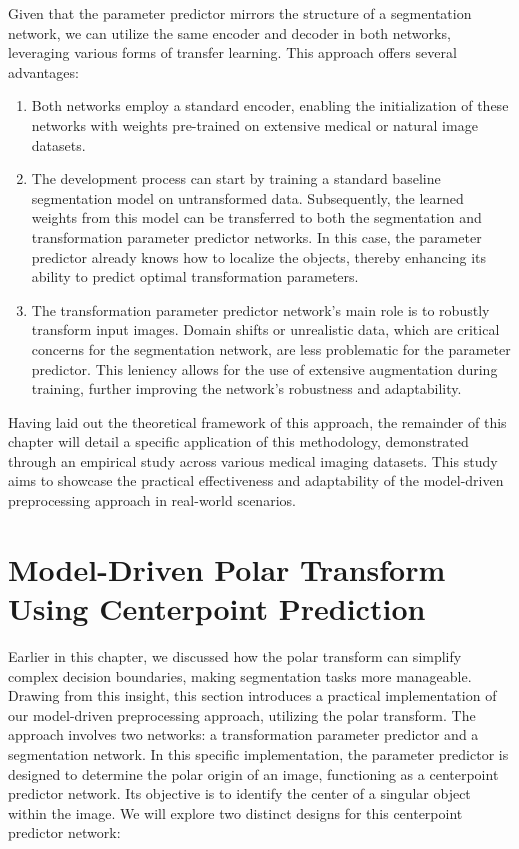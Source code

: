 Given that the parameter predictor mirrors the structure of a segmentation network, we can utilize the same encoder and decoder in both networks, leveraging various forms of transfer learning. This approach offers several advantages:

\begin{enumerate}
	\item Both networks employ a standard encoder, enabling the initialization of these networks with weights pre-trained on extensive medical or natural image datasets.
	\item The development process can start by training a standard baseline segmentation model on untransformed data. Subsequently, the learned weights from this model can be transferred to both the segmentation and transformation parameter predictor networks. In this case, the parameter predictor already knows how to localize the objects, thereby enhancing its ability to predict optimal transformation parameters.
	\item The transformation parameter predictor network's main role is to robustly transform input images. Domain shifts or unrealistic data, which are critical concerns for the segmentation network, are less problematic for the parameter predictor. This leniency allows for the use of extensive augmentation during training, further improving the network's robustness and adaptability.
\end{enumerate}

Having laid out the theoretical framework of this approach, the remainder of this chapter will detail a specific application of this methodology, demonstrated through an empirical study across various medical imaging datasets. This study aims to showcase the practical effectiveness and adaptability of the model-driven preprocessing approach in real-world scenarios.

\section{Model-Driven Polar Transform Using Centerpoint Prediction}
\label{polar-paper}

Earlier in this chapter, we discussed how the polar transform can simplify complex decision boundaries, making segmentation tasks more manageable. Drawing from this insight, this section introduces a practical implementation of our model-driven preprocessing approach, utilizing the polar transform. The approach involves two networks: a transformation parameter predictor and a segmentation network. In this specific implementation, the parameter predictor is designed to determine the polar origin of an image, functioning as a centerpoint predictor network. Its objective is to identify the center of a singular object within the image. We will explore two distinct designs for this centerpoint predictor network:

